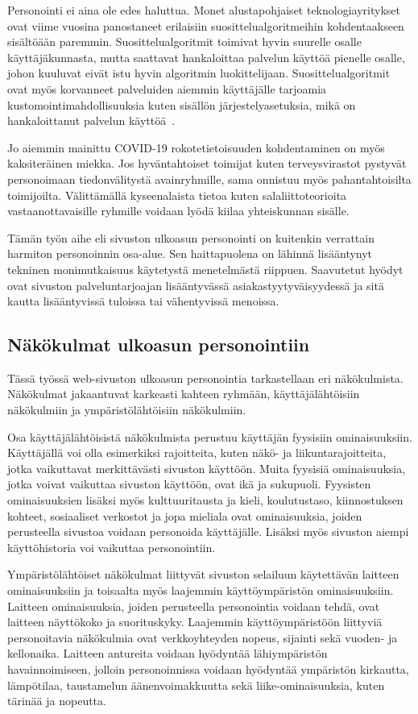 \documentclass[finnish, 12pt, a4paper, elec, utf8, a-1b, online]{aaltothesis}
\begin{document}
Personointi ei aina ole edes haluttua. Monet alustapohjaiset teknologiayritykset
ovat viime vuosina panostaneet erilaisiin suosittelualgoritmeihin kohdentaakseen
sisältöään paremmin. Suosittelualgoritmit toimivat hyvin suurelle osalle
käyttäjäkunnasta, mutta saattavat hankaloittaa palvelun käyttöä pienelle osalle,
johon kuuluvat eivät istu hyvin algoritmin luokittelijaan. Suosittelualgoritmit
ovat myös korvanneet palveluiden aiemmin käyttäjälle tarjoamia
kustomointimahdollisuuksia kuten sisällön järjestelyasetuksia, mikä on
hankaloittanut palvelun käyttöä~\cite{patel_2022}.

Jo aiemmin mainittu COVID-19 rokotetietoisuuden kohdentaminen on myös
kaksiteräinen miekka. Jos hyväntahtoiset toimijat kuten terveysvirastot pystyvät
personoimaan tiedonvälitystä avainryhmille, sama onnistuu myös pahantahtoisilta
toimijoilta. Välittämällä kyseenalaista tietoa kuten salaliittoteorioita
vastaanottavaisille ryhmille voidaan lyödä kiilaa yhteiskunnan sisälle.

Tämän työn aihe eli sivuston ulkoasun personointi on kuitenkin verrattain
harmiton personoinnin osa-alue. Sen haittapuolena on lähinnä lisääntynyt
tekninen monimutkaisuus käytetystä menetelmästä riippuen. Saavutetut hyödyt ovat
sivuston palveluntarjoajan lisääntyvässä asiakastyytyväisyydessä ja sitä
kautta lisääntyvissä tuloissa tai vähentyvissä menoissa.

\subsection{Näkökulmat ulkoasun personointiin}\label{personalization-aspects}

Tässä työssä web-sivuston ulkoasun personointia tarkastellaan eri näkökulmista.
Näkökulmat jakaantuvat karkeasti kahteen ryhmään, käyttäjälähtöisiin näkökulmiin
ja ympäristölähtöisiin näkökulmiin.

Osa käyttäjälähtöisistä näkökulmista perustuu käyttäjän fyysisiin
ominaisuuksiin. Käyttäjällä voi olla esimerkiksi rajoitteita, kuten näkö- ja
liikuntarajoitteita, jotka vaikuttavat merkittävästi sivuston käyttöön.
Muita fyysisiä ominaisuuksia, jotka voivat vaikuttaa sivuston käyttöön, ovat
ikä ja sukupuoli. Fyysisten ominaisuuksien lisäksi myös kulttuuritausta ja
kieli, koulutustaso, kiinnostuksen kohteet, sosiaaliset verkostot ja jopa
mieliala ovat ominaisuuksia, joiden perusteella sivustoa voidaan personoida
käyttäjälle. Lisäksi myös sivuston aiempi käyttöhistoria voi vaikuttaa
personointiin.

Ympäristölähtöiset näkökulmat liittyvät sivuston selailuun käytettävän
laitteen ominaisuuksiin ja toisaalta myös laajemmin käyttöympäristön
ominaisuuksiin. Laitteen ominaisuuksia, joiden perusteella personointia voidaan
tehdä, ovat laitteen näyttökoko ja suorituskyky. Laajemmin käyttöympäristöön
liittyviä personoitavia näkökulmia ovat verkkoyhteyden nopeus, sijainti sekä
vuoden- ja kellonaika. Laitteen antureita voidaan hyödyntää lähiympäristön
havainnoimiseen, jolloin personoinnissa voidaan hyödyntää ympäristön kirkautta,
lämpötilaa, taustamelun äänenvoimakkuutta sekä liike-ominaisuuksia, kuten
tärinää ja nopeutta.
\end{document}
